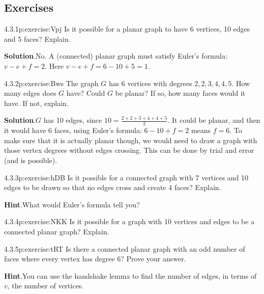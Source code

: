 \documentclass[twoside,11pt,]{book}
\newcommand{\blocktitlefont}{\relax}
\numberwithin{equation}{chapter}
\begin{document}
\subsection*{Exercises}
\begin{divisionsolution}{4.3.1}{}{p:exercise:Vpj}%
Is it possible for a planar graph to have 6 vertices, 10 edges and 5 faces? Explain.%
\par\smallskip%
\noindent\textbf{\blocktitlefont Solution}.\quad{}No. A (connected) planar graph must satisfy Euler's formula: \(v - e + f = 2\). Here \(v - e + f = 6 - 10 + 5 = 1\).%
\end{divisionsolution}%
\begin{divisionsolution}{4.3.2}{}{p:exercise:Bws}%
The graph \(G\) has 6 vertices with degrees \(2, 2, 3, 4, 4, 5\). How many edges does \(G\) have? Could \(G\) be planar? If so, how many faces would it have. If not, explain.%
\par\smallskip%
\noindent\textbf{\blocktitlefont Solution}.\quad{}\(G\) has 10 edges, since \(10 = \frac{2+2+3+4+4+5}{2}\). It could be planar, and then it would have 6 faces, using Euler's formula: \(6-10+f = 2\) means \(f = 6\). To make sure that it is actually planar though, we would need to draw a graph with those vertex degrees without edges crossing. This can be done by trial and error (and is possible).%
\end{divisionsolution}%
\begin{divisionsolution}{4.3.3}{}{p:exercise:hDB}%
Is it possible for a connected graph with 7 vertices and 10 edges to be drawn so that no edges cross and create 4 faces?  Explain.%
\par\smallskip%
\noindent\textbf{\blocktitlefont Hint}.\quad{}What would Euler's formula tell you?%
\end{divisionsolution}%
\begin{divisionsolution}{4.3.4}{}{p:exercise:NKK}%
Is it possible for a graph with 10 vertices and edges to be a connected planar graph?  Explain.%
\end{divisionsolution}%
\begin{divisionsolution}{4.3.5}{}{p:exercise:tRT}%
Is there a connected planar graph with an odd number of faces where every vertex has degree 6?  Prove your answer.%
\par\smallskip%
\noindent\textbf{\blocktitlefont Hint}.\quad{}You can use the handshake lemma to find the number of edges, in terms of \(v\), the number of vertices.%
\end{divisionsolution}%
\end{document}
